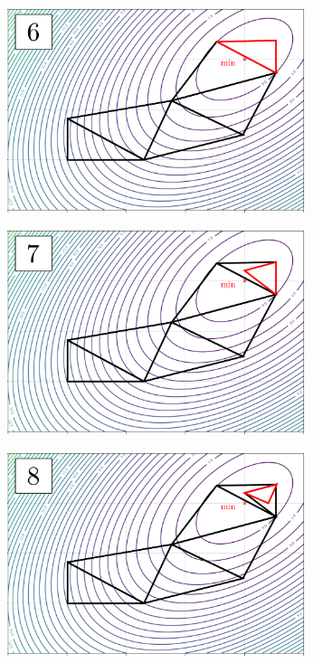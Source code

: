 \begin{figure}[H]
\begin{subfigure}[b]{0.32\textwidth}
	\end{subfigure}
	\begin{subfigure}[b]{0.32\textwidth}
		\centering
		\includegraphics[width=0.96\textwidth, trim={0 0 0 0}]{figures/nelder6.pdf}
	\end{subfigure}
	\centering
	\begin{subfigure}[b]{0.32\textwidth}
		\centering
		\includegraphics[width=0.96\textwidth, trim={0 0 0 0}]{figures/nelder7.pdf}
	\end{subfigure}
	\begin{subfigure}[b]{0.32\textwidth}
		\centering
		\includegraphics[width=0.96\textwidth, trim={0 0 0 0}]{figures/nelder8.pdf}

\end{subfigure}
\end{figure}

